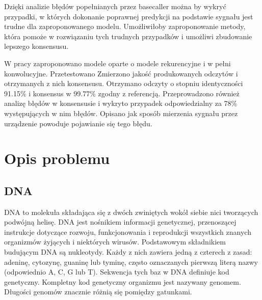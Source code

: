 \documentclass[a4paper,11pt,twoside]{report}
\theoremstyle{definition}
\begin{document}
Dzięki analizie błędów popełnianych przez basecaller można by wykryć przypadki, w których dokonanie poprawnej predykcji na podstawie sygnału jest trudne dla zaproponowanego modelu. Umożliwiłoby zaproponowanie metody, która pomoże w rozwiązaniu tych trudnych przypadków i umożliwi zbudowanie lepszego konsensusu.

W pracy zaproponowano modele oparte o modele rekurencyjne i w pełni konwolucyjne. Przetestowano Zmierzono jakość produkowanych odczytów i otrzymanych z nich konsensusu. Otrzymano odczyty o stopniu identyczności 91.15\% i konsensus w 99.77\% zgodny z referencją. Przeprowadzono również analizę błędów w konsensusie i wykryto przypadek odpowiedzialny za 78\% występujących w nim błędów. Opisano jak sposób mierzenia sygnału przez urządzenie powoduje pojawianie się tego błędu.


\chapter{Opis problemu}

\section{DNA}

DNA to molekuła składająca się z dwóch zwiniętych wokół siebie nici tworzących podwójną helisę. DNA jest nośnikiem informacji genetycznej, przenoszącej instrukcje dotyczące rozwoju, funkcjonowania i reprodukcji wszystkich znanych organizmów żyjących i niektórych wirusów. Podstawowym składnikiem budującym DNA są nukleotydy. Każdy z nich zawiera jedną z czterech z zasad: adeninę, cytozynę, guaninę lub tyminę, często oznaczanych pierwszą literą nazwy (odpowiednio A, C, G lub T). Sekwencja tych baz w DNA definiuje kod genetyczny. Kompletny kod genetyczny organizmu jest nazywany genomem. Długości genomów znacznie różnią się pomiędzy gatunkami.
\end{document}
